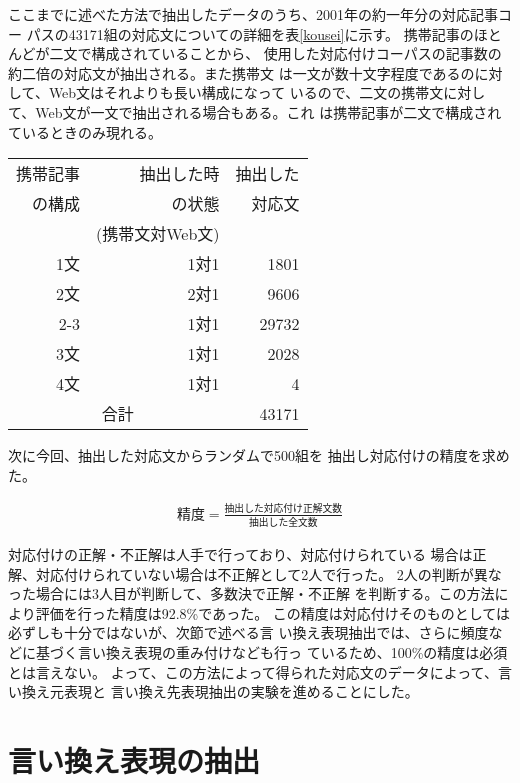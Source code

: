 \documentclass[jnlpbbl]{jnlp_j}
\begin{document}
ここまでに述べた方法で抽出したデータのうち、2001年の約一年分の対応記事コー
パスの43171組の対応文についての詳細を表\ref{kousei}に示す。
携帯記事のほとんどが二文で構成されていることから、
使用した対応付けコーパスの記事数の約二倍の対応文が抽出される。また携帯文
は一文が数十文字程度であるのに対して、Web文はそれよりも長い構成になって
いるので、二文の携帯文に対して、Web文が一文で抽出される場合もある。これ
は携帯記事が二文で構成されているときのみ現れる。


\begin{table*}[htb]
\caption{記事の構成文数と対応文の抽出状況}
\label{kousei}
\begin{center}
\begin{tabular}{|r|r|r|} \hline
携帯記事 & 抽出した時 & 抽出した \\の構成 &の状態 & 対応文 \\ & (携帯文対Web文) &  \\\hline\hline
1文 & 1対1 & 1801 \\\hline
2文 & 2対1 & 9606 \\\cline{2-3}
 & 1対1 & 29732 \\\hline
3文 & 1対1 & 2028 \\\hline

4文 & 1対1 & 4 \\\hline\hline
\multicolumn{2}{|c|}{合計} & 43171 \\\hline
\end{tabular}
\end{center}
\end{table*}

次に今回、抽出した対応文からランダムで500組を
抽出し対応付けの精度を求めた。

\begin{eqnarray}
\mbox{精度}  = \frac{\mbox{抽出した対応付け正解文数}}{\mbox{抽出した全文数}}
\end{eqnarray}

対応付けの正解・不正解は人手で行っており、対応付けられている
場合は正解、対応付けられていない場合は不正解として2人で行った。
2人の判断が異なった場合には3人目が判断して、多数決で正解・不正解
を判断する。この方法により評価を行った精度は92.8\%であった。
この精度は対応付けそのものとしては必ずしも十分ではないが、次節で述べる言
い換え表現抽出では、さらに頻度などに基づく言い換え表現の重み付けなども行っ
ているため、100\%の精度は必須とは言えない。
よって、この方法によって得られた対応文のデータによって、言い換え元表現と
言い換え先表現抽出の実験を進めることにした。


\section{言い換え表現の抽出}\label{sec:chushutu}
\end{document}

